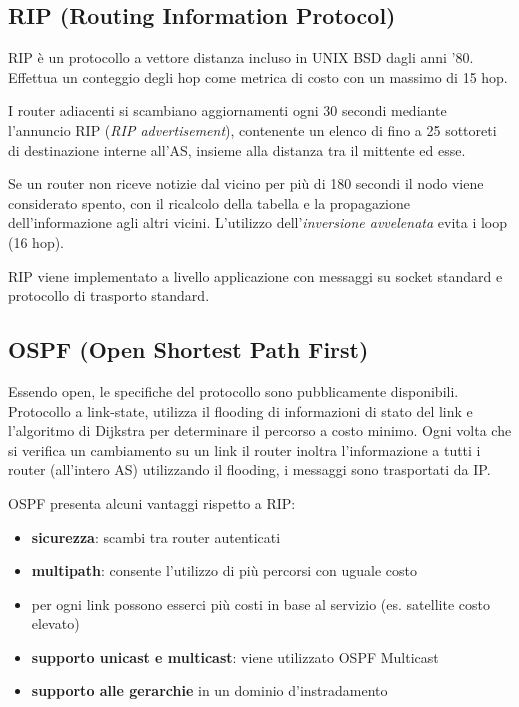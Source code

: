 \documentclass[
]{article}
\begin{document}
\hypertarget{header-n244}{%
\subsection{RIP (Routing Information Protocol)}\label{header-n244}}

RIP è un protocollo a vettore distanza incluso in UNIX BSD dagli anni
'80. Effettua un conteggio degli hop come metrica di costo con un
massimo di 15 hop.

I router adiacenti si scambiano aggiornamenti ogni 30 secondi mediante
l'annuncio RIP (\emph{RIP advertisement}), contenente un elenco di fino
a 25 sottoreti di destinazione interne all'AS, insieme alla distanza tra
il mittente ed esse.

Se un router non riceve notizie dal vicino per più di 180 secondi il
nodo viene considerato spento, con il ricalcolo della tabella e la
propagazione dell'informazione agli altri vicini. L'utilizzo
dell'\emph{inversione avvelenata} evita i loop (16 hop).

RIP viene implementato a livello applicazione con messaggi su socket
standard e protocollo di trasporto standard.

\hypertarget{header-n249}{%
\subsection{OSPF (Open Shortest Path First)}\label{header-n249}}

Essendo open, le specifiche del protocollo sono pubblicamente
disponibili. Protocollo a link-state, utilizza il flooding di
informazioni di stato del link e l'algoritmo di Dijkstra per determinare
il percorso a costo minimo. Ogni volta che si verifica un cambiamento su
un link il router inoltra l'informazione a tutti i router (all'intero
AS) utilizzando il flooding, i messaggi sono trasportati da IP.

OSPF presenta alcuni vantaggi rispetto a RIP:

\begin{itemize}
\item
  \textbf{sicurezza}: scambi tra router autenticati
\item
  \textbf{multipath}: consente l'utilizzo di più percorsi con uguale
  costo
\item
  per ogni link possono esserci più costi in base al servizio (es.
  satellite costo elevato)
\item
  \textbf{supporto unicast e multicast}: viene utilizzato OSPF Multicast
\item
  \textbf{supporto alle gerarchie} in un dominio d'instradamento
\end{itemize}
\end{document}
